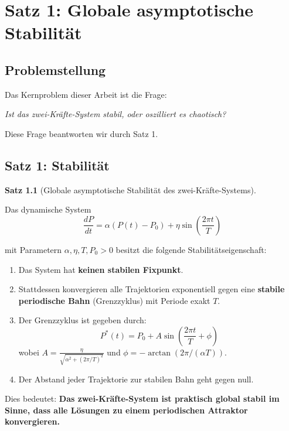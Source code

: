 \documentclass[a4paper,11pt]{report}
\theoremstyle{definition}
\newtheorem{satz}{Satz}[chapter]
\begin{document}
\chapter{Satz 1: Globale asymptotische Stabilität}

\section{Problemstellung}

Das Kernproblem dieser Arbeit ist die Frage:

\begin{center}
    \textit{Ist das zwei-Kräfte-System stabil, oder oszilliert es chaotisch?}
\end{center}

Diese Frage beantworten wir durch Satz 1.

\section{Satz 1: Stabilität}

\begin{satz}[Globale asymptotische Stabilität des zwei-Kräfte-Systems]\label{satz:stabilitaet}
    
    Das dynamische System
    \begin{equation}
        \frac{dP}{dt} = \alpha(P(t) - P_0) + \eta \sin\left(\frac{2\pi t}{T}\right)
    \end{equation}
    
    mit Parametern $\alpha, \eta, T, P_0 > 0$ besitzt die folgende Stabilitätseigenschaft:
    
    \begin{enumerate}
        \item Das System hat \textbf{keinen stabilen Fixpunkt}.
        \item Stattdessen konvergieren alle Trajektorien exponentiell gegen eine \textbf{stabile periodische Bahn} (Grenzzyklus) mit Periode exakt $T$.
        \item Der Grenzzyklus ist gegeben durch:
        \begin{equation}
            P^*(t) = P_0 + A \sin\left(\frac{2\pi t}{T} + \phi\right)
        \end{equation}
        wobei $A = \frac{\eta}{\sqrt{\alpha^2 + (2\pi/T)^2}}$ und $\phi = -\arctan(2\pi / (\alpha T))$.
        \item Der Abstand jeder Trajektorie zur stabilen Bahn geht gegen null.
    \end{enumerate}
    
    Dies bedeutet: \textbf{Das zwei-Kräfte-System ist praktisch global stabil im Sinne, dass alle Lösungen zu einem periodischen Attraktor konvergieren.}
\end{satz}
\end{document}
